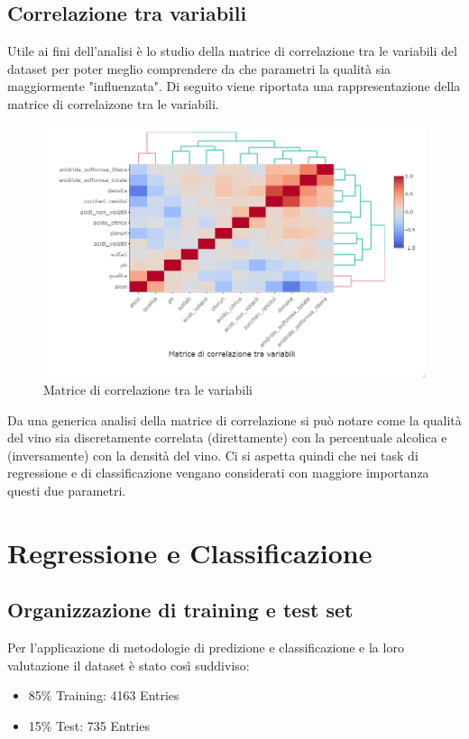 \documentclass[12pt]{article}
\begin{document}
\subsection{Correlazione tra variabili}
Utile ai fini dell'analisi è lo studio della matrice di correlazione tra le variabili del dataset per poter meglio comprendere da che parametri la qualità sia maggiormente "influenzata". Di seguito viene riportata una rappresentazione della matrice di correlaizone tra le variabili.
\begin{figure}[!htb]
    \centering
    \includegraphics[width=1\textwidth]{immagini/cor.png}
    \caption{Matrice di correlazione tra le variabili}
\end{figure}
\FloatBarrier
Da una generica analisi della matrice di correlazione si può notare come la qualità del vino sia discretamente correlata (direttamente) con la percentuale alcolica e (inversamente) con la densità del vino. Ci si aspetta quindi che nei task di regressione e di classificazione vengano considerati con maggiore importanza questi due parametri.
\newpage
\section{Regressione e Classificazione}
\subsection{Organizzazione di training e test set}
Per l'applicazione di metodologie di predizione e classificazione e la loro valutazione il dataset è stato così suddiviso:
\begin{itemize}
    \item 85\% Training: 4163 Entries
    \item 15\% Test: 735 Entries
\end{itemize}
\end{document}
